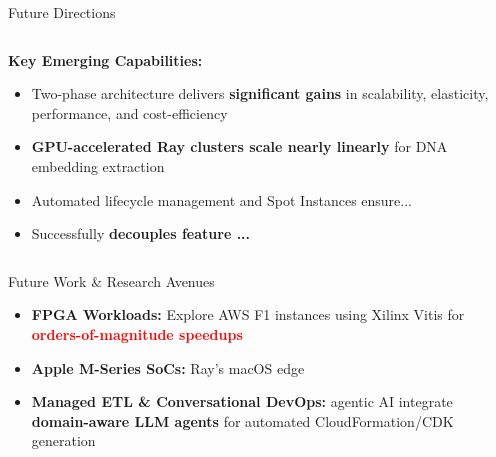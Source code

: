 \documentclass[aspectratio=169]{beamer}
\begin{document}
\begin{frame}{Future Directions}
    \begin{columns}
        \begin{column}{0.6\textwidth}
            \textbf{Key Emerging Capabilities:}
            \begin{itemize}
                \item Two-phase architecture delivers \textbf{significant gains} in scalability, elasticity, performance, and cost-efficiency
                \item \textcolor{rayblue}{\textbf{GPU-accelerated Ray clusters scale nearly linearly}} for DNA embedding extraction
                \item Automated lifecycle management and Spot Instances ensure...
                \item Successfully \textbf{decouples feature ...}
            \end{itemize}
        \end{column}
        \begin{column}{0.4\textwidth}
        \end{column}
    \end{columns}
    
    \vspace{0.3cm}
    \begin{block}{Future Work \& Research Avenues}
        \begin{itemize}
            \item \textbf{FPGA Workloads:} Explore AWS F1 instances using Xilinx Vitis for \textcolor{red}{\textbf{orders-of-magnitude speedups}}
            \item \textbf{Apple M-Series SoCs:} Ray's  macOS  edge 
            \item \textbf{Managed ETL \& Conversational DevOps:} agentic AI integrate \textcolor{rayblue}{\textbf{domain-aware LLM agents}} for automated CloudFormation/CDK generation
        \end{itemize}
    \end{block}
\end{frame}
\end{document}
